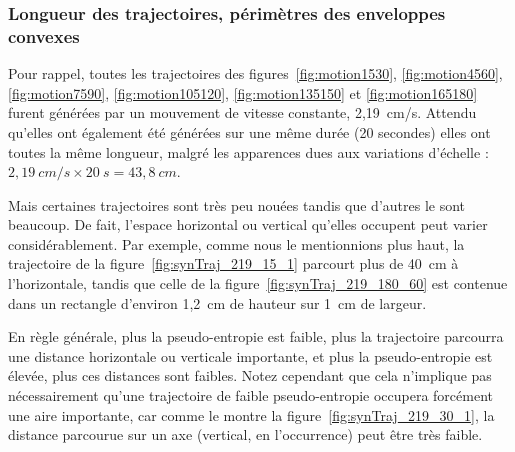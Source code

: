 	\FloatBarrier \subsubsection{Longueur des trajectoires, périmètres des enveloppes convexes}
	Pour rappel, toutes les trajectoires des figures~\ref{fig:motion1530}, \ref{fig:motion4560}, \ref{fig:motion7590}, \ref{fig:motion105120}, \ref{fig:motion135150} et \ref{fig:motion165180} furent générées par un mouvement de vitesse constante, 2,19~cm/s. Attendu qu'elles ont également été générées sur une même durée (20 secondes) elles ont toutes la même longueur, malgré les apparences dues aux variations d'échelle : $2,19~cm/s \times 20~s = 43,8~cm$.
	
	Mais certaines trajectoires sont très peu \og nouées \fg{} tandis que d'autres le sont beaucoup. De fait, l'espace horizontal ou vertical qu'elles occupent peut varier considérablement. Par exemple, comme nous le mentionnions plus haut,	la trajectoire de la figure~\ref{fig:synTraj_219_15_1} parcourt plus de 40~cm à l'horizontale, tandis que celle de la figure~\ref{fig:synTraj_219_180_60} est contenue dans un rectangle d'environ 1,2~cm de hauteur sur 1~cm de largeur.
	
	En règle générale, plus la pseudo-entropie est faible, plus la trajectoire parcourra une distance horizontale ou verticale importante, et plus la pseudo-entropie est élevée, plus ces distances sont faibles. Notez cependant que cela n'implique pas nécessairement qu'une trajectoire de faible pseudo-entropie occupera forcément une aire importante, car comme le montre la figure~\ref{fig:synTraj_219_30_1}, la distance parcourue sur un axe (vertical, en l'occurrence) peut être très faible.
	

